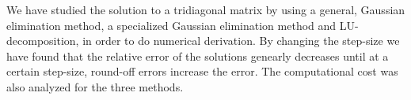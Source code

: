 We have studied the solution to a tridiagonal matrix by using a general, Gaussian elimination method, a specialized Gaussian elimination method and LU-decomposition, in order to do numerical derivation. By changing the step-size we have found that the relative error of the solutions  genearly decreases until at a certain step-size, round-off errors increase the error. The computational cost was also analyzed for the three methods. 